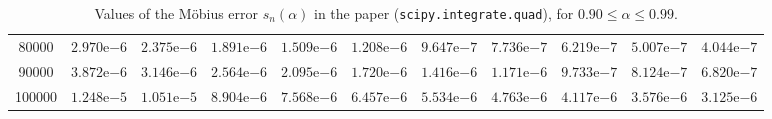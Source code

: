 \begin{table}[ht!]
{\begin{tabular}{|c|c|c|c|c|c|c|c|c|c|c|}
80000  & $2.970\mathrm{e}{-6}$ & $2.375\mathrm{e}{-6}$ & $1.891\mathrm{e}{-6}$ & $1.509\mathrm{e}{-6}$ & $1.208\mathrm{e}{-6}$ & $9.647\mathrm{e}{-7}$ & $7.736\mathrm{e}{-7}$ & $6.219\mathrm{e}{-7}$ & $5.007\mathrm{e}{-7}$ & $4.044\mathrm{e}{-7}$ \\
90000  & $3.872\mathrm{e}{-6}$ & $3.146\mathrm{e}{-6}$ & $2.564\mathrm{e}{-6}$ & $2.095\mathrm{e}{-6}$ & $1.720\mathrm{e}{-6}$ & $1.416\mathrm{e}{-6}$ & $1.171\mathrm{e}{-6}$ & $9.733\mathrm{e}{-7}$ & $8.124\mathrm{e}{-7}$ & $6.820\mathrm{e}{-7}$ \\
100000 & $1.248\mathrm{e}{-5}$ & $1.051\mathrm{e}{-5}$ & $8.904\mathrm{e}{-6}$ & $7.568\mathrm{e}{-6}$ & $6.457\mathrm{e}{-6}$ & $5.534\mathrm{e}{-6}$ & $4.763\mathrm{e}{-6}$ & $4.117\mathrm{e}{-6}$ & $3.576\mathrm{e}{-6}$ & $3.125\mathrm{e}{-6}$ \\
\hline
\end{tabular}}
\caption{Values of the M\"obius error $s_n(\alpha)$ in the paper (\texttt{scipy.integrate.quad}), for $0.90 \leq \alpha \leq 0.99$.}
\label{tab:alpha09-py}
\end{table}

